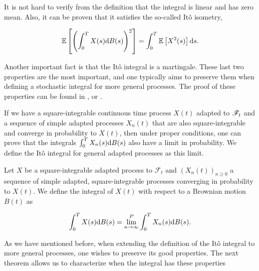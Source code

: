 It is not hard to verify from the definition that the integral is linear and has zero mean. Also, it can be proven that it satisfies the so-called Itô isometry,

\begin{equation*}
    \mathbb E \left[  \left( \int_0^T X(s) \mathrm d B(s)\right)^2  \right] = \int_0^T \mathbb E \left[ X^2(s) \right] \mathrm d s.
\end{equation*}

Another important fact is that the Itô integral is a martingale. These last two properties are the most important, and one typically aims to preserve them when defining a stochastic integral for more general processes. The proof of these properties can be found in \cite{book:legall}, \cite{book:klebaner} or \cite{book:karatzas}.

If we have a square-integrable continuous time process $X(t)$ adapted to $\mathscr F_t$ and a sequence of simple adapted processes $X_n(t)$ that are also square-integrable and converge in probability to $X(t)$, then under proper conditions, one can prove that the integrals $\int_0^T X_n(s)\mathrm d B(s)$ also have a limit in probability. We define the Itô integral for general adapted processes as this limit.

\begin{definition}
    Let $X$ be a square-integrable adapted process to $\mathscr F_t$ and $(X_n(t))_{n\ge 0}$ a sequence of simple adapted, square-integrable processes converging in probability to $X(t)$. We define the integral of $X(t)$ with respect to a Brownian motion $B(t)$ as

    \begin{equation*}
        \int_0^T X(s) \mathrm d B(s) = \lim_{n\to\infty}^P \int_0^T X_n(s) \mathrm d B(s).
    \end{equation*}
\end{definition}

As we have mentioned before, when extending the definition of the Itô integral to more general processes, one wishes to preserve its good properties. The next theorem allows us to characterize when the integral has these properties

